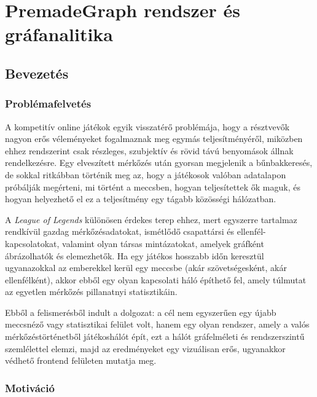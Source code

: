 





\part{PremadeGraph rendszer és gráfanalitika}

\chapter{Bevezetés}

\section{Problémafelvetés}

A kompetitív online játékok egyik visszatérő problémája, hogy a résztvevők nagyon erős véleményeket fogalmaznak meg egymás teljesítményéről, miközben ehhez rendszerint csak részleges, szubjektív és rövid távú benyomások állnak rendelkezésre. Egy elveszített mérkőzés után gyorsan megjelenik a bűnbakkeresés, de sokkal ritkábban történik meg az, hogy a játékosok valóban adatalapon próbálják megérteni, mi történt a meccsben, hogyan teljesítettek ők maguk, és hogyan helyezhető el ez a teljesítmény egy tágabb közösségi hálózatban.

A \emph{League of Legends} különösen érdekes terep ehhez, mert egyszerre tartalmaz rendkívül gazdag mérkőzésadatokat, ismétlődő csapattársi és ellenfél-kapcsolatokat, valamint olyan társas mintázatokat, amelyek gráfként ábrázolhatók és elemezhetők. Ha egy játékos hosszabb időn keresztül ugyanazokkal az emberekkel kerül egy meccsbe (akár szövetségesként, akár ellenfélként), akkor ebből egy olyan kapcsolati háló építhető fel, amely túlmutat az egyetlen mérkőzés pillanatnyi statisztikáin.

Ebből a felismerésből indult a dolgozat: a cél nem egyszerűen egy újabb meccsnéző vagy statisztikai felület volt, hanem egy olyan rendszer, amely a valós mérkőzéstörténetből játékoshálót épít, ezt a hálót gráfelméleti és rendszerszintű szemlélettel elemzi, majd az eredményeket egy vizuálisan erős, ugyanakkor védhető frontend felületen mutatja meg.

\section{Motiváció}

